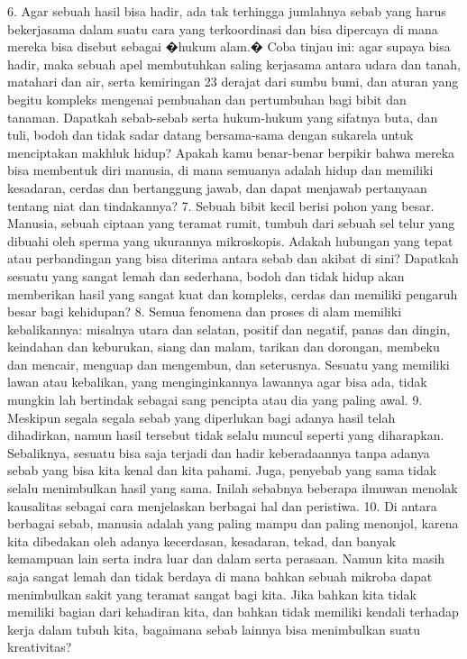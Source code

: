 \documentclass[]{article}
\begin{document}
6. Agar sebuah hasil bisa hadir, ada tak terhingga jumlahnya sebab yang harus bekerjasama dalam suatu cara yang terkoordinasi dan bisa dipercaya di mana mereka bisa disebut sebagai �hukum alam.� Coba tinjau ini: agar supaya bisa hadir, maka sebuah apel membutuhkan saling kerjasama antara udara dan tanah, matahari dan air, serta kemiringan 23 derajat dari sumbu  bumi, dan aturan yang begitu kompleks mengenai pembuahan dan pertumbuhan bagi bibit dan tanaman. Dapatkah sebab-sebab serta hukum-hukum yang sifatnya buta, dan tuli, bodoh dan tidak sadar datang bersama-sama dengan sukarela untuk menciptakan makhluk hidup? Apakah kamu benar-benar berpikir bahwa mereka bisa membentuk diri manusia, di mana semuanya adalah hidup dan memiliki kesadaran, cerdas dan bertanggung jawab, dan dapat menjawab pertanyaan tentang niat dan tindakannya?
7. Sebuah bibit kecil berisi pohon yang besar. Manusia, sebuah ciptaan yang teramat rumit, tumbuh dari sebuah sel telur yang dibuahi oleh sperma yang ukurannya mikroskopis. Adakah hubungan yang tepat atau perbandingan yang bisa diterima antara sebab dan akibat di sini? Dapatkah sesuatu yang sangat lemah dan sederhana, bodoh dan tidak hidup akan memberikan hasil yang sangat kuat dan kompleks, cerdas dan memiliki pengaruh besar bagi kehidupan?
8. Semua fenomena dan proses di alam memiliki kebalikannya: misalnya utara dan selatan, positif dan negatif, panas dan dingin,  keindahan dan keburukan, siang dan malam, tarikan dan dorongan, membeku dan mencair, menguap dan mengembun, dan seterusnya.  Sesuatu yang memiliki lawan atau kebalikan, yang menginginkannya lawannya agar bisa ada,  tidak mungkin lah bertindak sebagai sang pencipta atau dia yang paling awal.
9. Meskipun segala segala sebab yang diperlukan bagi adanya hasil telah dihadirkan, namun hasil tersebut tidak selalu muncul seperti yang diharapkan. Sebaliknya, sesuatu  bisa saja terjadi dan hadir keberadaannya tanpa adanya sebab yang bisa kita kenal dan kita pahami. Juga, penyebab yang sama tidak selalu menimbulkan hasil yang sama. Inilah sebabnya beberapa ilmuwan menolak kausalitas sebagai cara menjelaskan berbagai hal dan peristiwa.
10. Di antara berbagai sebab, manusia adalah yang paling mampu dan paling menonjol, karena kita dibedakan oleh adanya kecerdasan,  kesadaran, tekad, dan banyak kemampuan lain serta indra luar dan dalam serta perasaan. Namun kita masih saja sangat lemah dan tidak berdaya di mana bahkan sebuah mikroba dapat menimbulkan sakit yang teramat sangat bagi kita. Jika bahkan kita tidak memiliki bagian dari kehadiran kita, dan bahkan tidak memiliki kendali terhadap kerja dalam tubuh kita, bagaimana sebab lainnya bisa menimbulkan suatu kreativitas?
\end{document}
